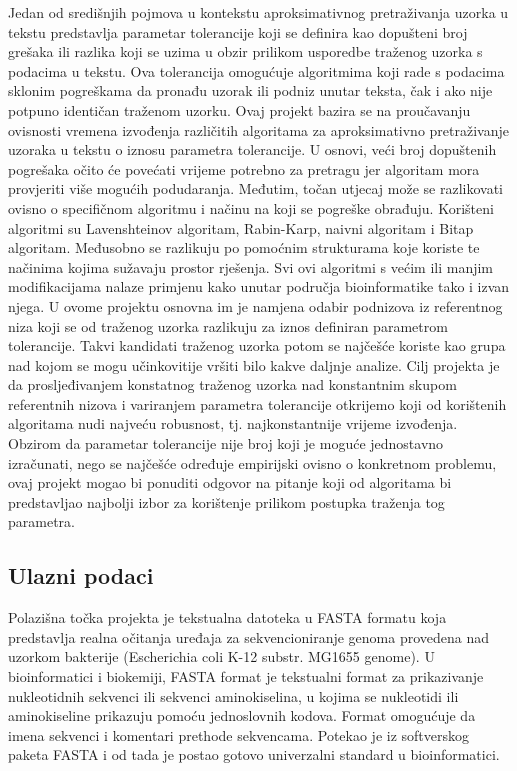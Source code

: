 \documentclass[conference]{IEEEtran}
\begin{document}
Jedan od središnjih pojmova u kontekstu aproksimativnog pretraživanja uzorka u tekstu predstavlja  parametar tolerancije koji se definira kao dopušteni broj grešaka ili razlika koji se uzima u obzir prilikom usporedbe traženog uzorka s podacima u tekstu. Ova tolerancija omogućuje algoritmima koji rade s podacima sklonim pogreškama da pronađu uzorak ili podniz unutar teksta, čak i ako nije potpuno identičan traženom uzorku. Ovaj projekt bazira se na proučavanju ovisnosti vremena izvođenja različitih algoritama za aproksimativno pretraživanje uzoraka u tekstu o iznosu parametra tolerancije. U osnovi, veći broj dopuštenih pogrešaka očito će povećati vrijeme potrebno za pretragu jer algoritam mora provjeriti više mogućih podudaranja. Međutim, točan utjecaj može se razlikovati ovisno o specifičnom algoritmu i načinu na koji se pogreške obrađuju. Korišteni algoritmi su Lavenshteinov algoritam, Rabin-Karp, naivni algoritam i Bitap algoritam. Međusobno se razlikuju po pomoćnim strukturama koje koriste te načinima kojima sužavaju prostor rješenja. Svi ovi algoritmi s većim ili manjim modifikacijama nalaze  primjenu kako unutar područja bioinformatike tako i izvan njega. U ovome projektu osnovna im je namjena odabir podnizova iz referentnog niza koji se od traženog uzorka razlikuju za iznos definiran parametrom tolerancije. Takvi kandidati traženog uzorka potom se najčešće koriste kao grupa nad kojom se mogu učinkovitije vršiti bilo kakve daljnje analize. Cilj projekta je da prosljeđivanjem  konstatnog traženog uzorka nad konstantnim skupom referentnih nizova i variranjem parametra tolerancije otkrijemo koji od korištenih algoritama nudi najveću robusnost, tj. najkonstantnije vrijeme izvođenja. Obzirom da parametar tolerancije nije broj koji je moguće jednostavno izračunati, nego se najčešće određuje empirijski  ovisno o konkretnom problemu, ovaj projekt mogao bi ponuditi odgovor na pitanje koji od algoritama bi predstavljao najbolji izbor za korištenje prilikom postupka traženja tog parametra. 

\subsection{Ulazni podaci}
Polazišna točka projekta je tekstualna datoteka u FASTA formatu koja predstavlja realna očitanja uređaja za sekvencioniranje genoma provedena nad uzorkom bakterije (Escherichia coli K-12 substr. MG1655 genome). U bioinformatici i biokemiji, FASTA format je tekstualni format za prikazivanje nukleotidnih sekvenci ili sekvenci aminokiselina, u kojima se nukleotidi ili aminokiseline prikazuju pomoću jednoslovnih kodova. Format omogućuje da imena sekvenci i komentari prethode sekvencama. Potekao je iz softverskog paketa FASTA i od tada je postao gotovo univerzalni standard u bioinformatici. 
\end{document}
